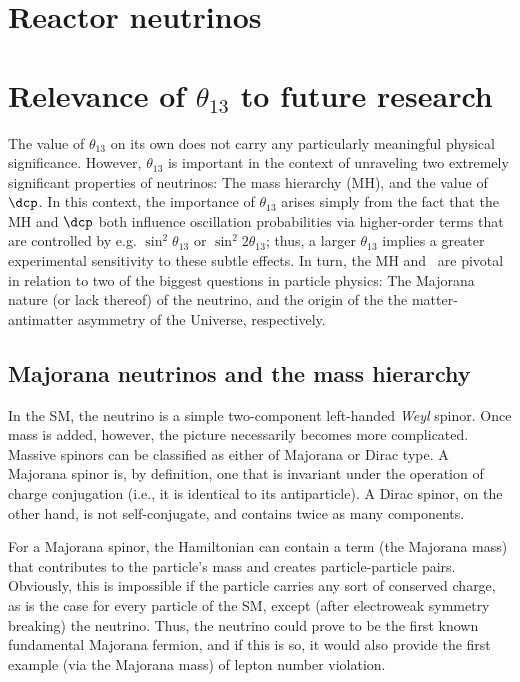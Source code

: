 \documentclass[../thesis.tex]{subfiles}
\begin{document}
\section{Reactor neutrinos}
\label{sec:introReactor}

\section{Relevance of $\theta_{13}$ to future research}
\label{sec:futureRelevance}

The value of $\theta_{13}$ on its own does not carry any particularly meaningful
physical significance. However, $\theta_{13}$ is important in the context of
unraveling two extremely significant properties of neutrinos: The mass hierarchy
(MH), and the value of $\dcp$. In this context, the importance of $\theta_{13}$
arises simply from the fact that the MH and $\dcp$ both influence oscillation
probabilities via higher-order terms that are controlled by e.g.
$\sin^2\theta_{13}$ or $\sin^2 2\theta_{13}$; thus, a larger $\theta_{13}$
implies a greater experimental sensitivity to these subtle effects. In turn, the
MH and \dcp\ are pivotal in relation to two of the biggest questions in
particle physics: The Majorana nature (or lack thereof) of the neutrino, and the
origin of the the matter-antimatter asymmetry of the Universe, respectively.

\subsection{Majorana neutrinos and the mass hierarchy}
\label{sec:majorana}

In the SM, the neutrino is a simple two-component left-handed \emph{Weyl}
spinor. Once mass is added, however, the picture necessarily becomes more
complicated. Massive spinors can be classified as either of Majorana or Dirac
type. A Majorana spinor is, by definition, one that is invariant under the
operation of charge conjugation (i.e., it is identical to its antiparticle). A
Dirac spinor, on the other hand, is not self-conjugate, and contains twice as
many components.

For a Majorana spinor, the Hamiltonian can contain a term (the Majorana
mass) that contributes to the particle's mass and creates particle-particle
pairs. Obviously, this is impossible if the particle carries any sort of
conserved charge, as is the case for every particle of the SM, except (after
electroweak symmetry breaking) the neutrino. Thus, the neutrino could prove to
be the first known fundamental Majorana fermion, and if this is so, it would
also provide the first example (via the Majorana mass) of lepton number
violation.
\end{document}
